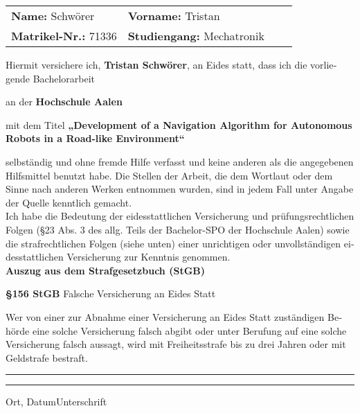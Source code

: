 \begin{otherlanguage}{ngerman}

\vspace*{5mm}

\thispagestyle{empty}

\begin{flushleft}
\begin{tabular}[h]{p{60mm}l p{60mm}l}
\textbf{Name:} Schwörer 			&\textbf{Vorname:} Tristan\\
\textbf{Matrikel-Nr.:} 71336		&\textbf{Studiengang:} Mechatronik\\
\end{tabular}
\end{flushleft}

\vspace*{11mm}

Hiermit versichere ich, \textbf{Tristan Schwörer}, an Eides statt, dass ich die vorliegende Bachelorarbeit

an der \textbf{Hochschule Aalen}

mit dem Titel \textbf{„Development of a Navigation Algorithm for Autonomous Robots in a Road-like Environment“}

selbständig und ohne fremde Hilfe verfasst und keine anderen als die angegebenen Hilfsmittel benutzt habe. Die Stellen der Arbeit, die dem Wortlaut oder dem Sinne nach anderen Werken entnommen wurden, sind in jedem Fall unter Angabe der Quelle kenntlich gemacht.\\

Ich habe die Bedeutung der eidesstattlichen Versicherung und prüfungsrechtlichen Folgen (\S 23 Abs. 3 des allg. Teils der Bachelor-SPO der Hochschule Aalen) sowie die strafrechtlichen Folgen (siehe unten) einer unrichtigen oder unvollständigen eidesstattlichen Versicherung zur Kenntnis genommen.\\

\vspace*{5mm}
\Large\textbf{Auszug aus dem Strafgesetzbuch (StGB)}


\normalsize\textbf{\S 156 StGB} Falsche Versicherung an Eides Statt

Wer von einer zur Abnahme einer Versicherung an Eides Statt zuständigen Behörde eine solche Versicherung falsch abgibt oder unter Berufung auf eine solche Versicherung falsch aussagt, wird mit Freiheitsstrafe bis zu drei Jahren oder mit Geldstrafe bestraft.

\vspace*{20mm}


\rule[-0.2cm]{5cm}{0.5pt} \hspace*{30mm}\rule[-0.2cm]{5cm}{0.5pt}
\newline
Ort, Datum\hspace*{61.85mm}Unterschrift

\end{otherlanguage}